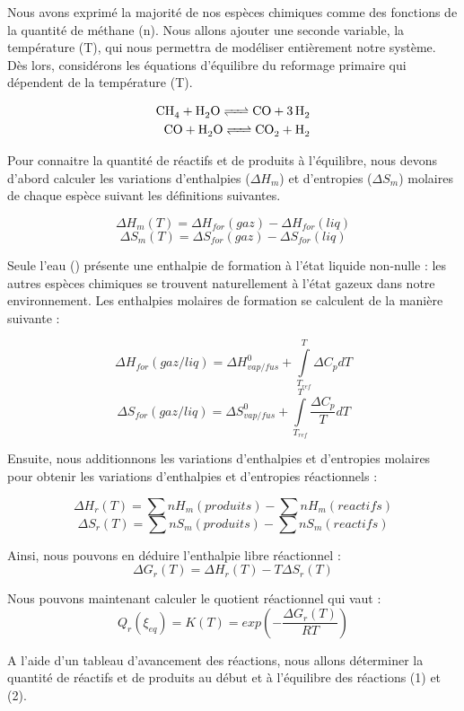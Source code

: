 \documentclass{article}
\begin{document}
Nous avons exprimé la majorité de nos espèces chimiques comme des fonctions de la quantité de méthane (n). Nous allons ajouter une seconde variable, la température (T), qui nous permettra de modéliser entièrement notre système. Dès lors, considérons les équations d'équilibre du reformage primaire qui dépendent de la température (T).\footnotemark

\begin{center}


\begin{varwidth}{\textwidth}
\begin{align}
 \ce{CH4 +H2O <=> CO +3H2} \\
\ce{CO +H2O <=> CO2 + H2}
\end{align}
\end{varwidth}
\end{center}

Pour connaitre la quantité de réactifs et de produits à l'équilibre, nous devons d'abord calculer les variations d'enthalpies ($\Delta H_{m}$) et d'entropies ($\Delta S_{m}$) molaires de chaque espèce suivant les définitions suivantes.

$$\Delta H_{m}(T)=\Delta H_{for}(gaz)-\Delta H_{for}(liq)$$
$$\Delta S_{m} (T)=\Delta S_{for}(gaz)-\Delta S_{for}(liq)$$

Seule l'eau () présente une enthalpie de formation à l'état liquide non-nulle : les autres espèces chimiques se trouvent naturellement à l'état gazeux dans notre environnement. Les enthalpies molaires de formation se calculent de la manière suivante : 

$$\Delta H_{for}(gaz/liq)=\Delta H^0_{vap/fus} + \int\limits_{T_{ref}}^T {\Delta C_p dT}$$
$$\Delta S_{for}(gaz/liq)=\Delta S^0_{vap/fus} + \int\limits_{T_{ref}}^T {\frac{\Delta  C_p}{T} dT}$$

Ensuite, nous additionnons les variations d'enthalpies et d'entropies molaires pour obtenir les variations d'enthalpies et d'entropies réactionnels : 

$$\Delta H_{r}(T) = \sum nH_m(produits) - \sum nH_m(reactifs)$$
$$\Delta S_{r}(T) = \sum nS_m(produits) - \sum nS_m(reactifs)$$

Ainsi, nous pouvons en déduire l'enthalpie libre réactionnel :  $$\Delta G_r(T) = \Delta H_{r}(T)-T\Delta S_{r}(T)$$

Nous pouvons maintenant calculer le quotient réactionnel qui vaut : $$ Q_r(\xi_{eq}) = K(T) = exp(-\frac{\Delta G_r(T)}{RT})$$ 

A l'aide d'un tableau d'avancement des réactions, nous allons déterminer la quantité de réactifs et de produits au début et à l'équilibre des réactions (1) et (2).
\end{document}
